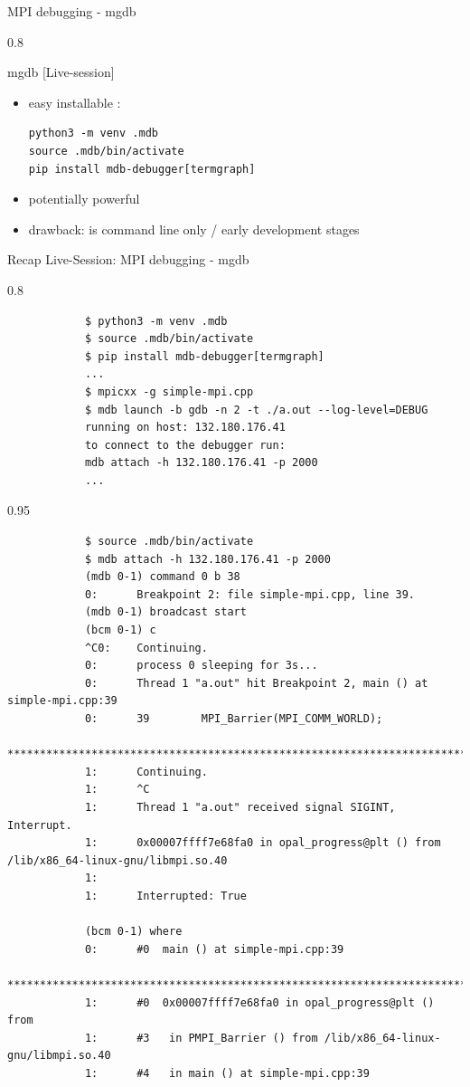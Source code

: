 \documentclass[aspectratio=1610]{beamer}
\newenvironment{centeredblock}[2][0.8\textwidth]
{ %
	\begin{center}
		\begin{varwidth}{#1} %
			\begin{block}{#2}
				\centering
			}
			{ %
			\end{block}
		\end{varwidth}
	\end{center}
}
\begin{document}
	\begin{frame}[fragile]{MPI debugging - mgdb}
		\begin{centeredblock}{mgdb [Live-session]}
			\begin{itemize}
				\item easy installable : \begin{verbatim}
python3 -m venv .mdb
source .mdb/bin/activate
pip install mdb-debugger[termgraph]
				\end{verbatim} 
				\item potentially powerful
				\item drawback: is command line only / early development stages
			\end{itemize}
		\end{centeredblock}
	\end{frame}

\begin{frame}[fragile]{Recap Live-Session: MPI debugging - mgdb}
	\begin{centeredblock}{}
		\begin{verbatim}
			$ python3 -m venv .mdb
			$ source .mdb/bin/activate
			$ pip install mdb-debugger[termgraph]
			...
			$ mpicxx -g simple-mpi.cpp 
			$ mdb launch -b gdb -n 2 -t ./a.out --log-level=DEBUG
			running on host: 132.180.176.41
			to connect to the debugger run:
			mdb attach -h 132.180.176.41 -p 2000
			...
		\end{verbatim}
	\end{centeredblock}
	\begin{centeredblock}[0.95 \textwidth]{}
		\begin{verbatim}
			$ source .mdb/bin/activate
			$ mdb attach -h 132.180.176.41 -p 2000
			(mdb 0-1) command 0 b 38
			0:      Breakpoint 2: file simple-mpi.cpp, line 39.
			(mdb 0-1) broadcast start
			(bcm 0-1) c
			^C0:    Continuing.
			0:      process 0 sleeping for 3s...
			0:      Thread 1 "a.out" hit Breakpoint 2, main () at simple-mpi.cpp:39
			0:      39        MPI_Barrier(MPI_COMM_WORLD);
			************************************************************************
			1:      Continuing.
			1:      ^C
			1:      Thread 1 "a.out" received signal SIGINT, Interrupt.
			1:      0x00007ffff7e68fa0 in opal_progress@plt () from /lib/x86_64-linux-gnu/libmpi.so.40
			1:
			1:      Interrupted: True
			
			(bcm 0-1) where
			0:      #0  main () at simple-mpi.cpp:39
			************************************************************************
			1:      #0  0x00007ffff7e68fa0 in opal_progress@plt () from 
			1:      #3   in PMPI_Barrier () from /lib/x86_64-linux-gnu/libmpi.so.40
			1:      #4   in main () at simple-mpi.cpp:39
		\end{verbatim}
	\end{centeredblock}
\end{frame}
\end{document}
